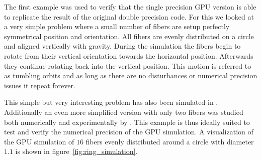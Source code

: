 \documentclass[a4paper,11pt]{kth-mag}
\begin{document}
The first example was used to verify that the single precision GPU version is able to replicate the result of the original double precision code. For this we looked at a very simple problem where a small number of fibers are setup perfectly symmetrical position and orientation. All fibers are evenly distributed on a circle and aligned vertically with gravity. During the simulation the fibers begin to rotate from their vertical orientation towards the horizontal position. Afterwards they continue rotating back into the vertical position. This motion is referred to as tumbling orbits and as long as there are no disturbances or numerical precision issues it repeat forever.

This simple but very interesting problem has also been simulated in \cite{}. Additionally an even more simplified version with only two fibers was studied both numerically and experimentally by \cite{}. This example is thus ideally suited to test and verify the numerical precision of the GPU simulation. A visualization of the GPU simulation of $16$ fibers evenly distributed around a circle with diameter $1.1$ is shown in figure~\ref{fig:ring_simulation}.
\end{document}
